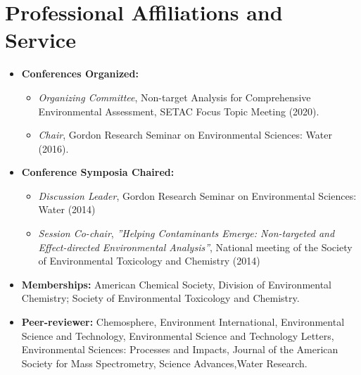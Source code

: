 \documentclass[letterpaper,10pt]{article}
\begin{document}
\section{Professional Affiliations and Service} 
\begin{itemize}
\item \textbf{Conferences Organized:} 
\begin{itemize}
\item \emph{Organizing Committee}, Non-target Analysis for Comprehensive Environmental Assessment, SETAC Focus Topic Meeting (2020).
\item \emph{Chair}, Gordon Research Seminar on Environmental Sciences: Water (2016).
\end{itemize}
\item \textbf{Conference Symposia Chaired:} 
\begin{itemize}
\item {} \emph{Discussion Leader}, Gordon Research Seminar on Environmental Sciences: Water (2014)
\item {} \emph{Session Co-chair}, \emph{''Helping Contaminants Emerge: Non-targeted and Effect-directed Environmental Analysis''}, National meeting of the Society of Environmental Toxicology and Chemistry (2014)
\end{itemize}
\item \textbf{Memberships:} American Chemical Society, Division of Environmental Chemistry; Society of Environmental Toxicology and Chemistry.
\item \textbf{Peer-reviewer:} Chemosphere,  Environment International, Environmental Science and Technology, Environmental Science and Technology Letters, Environmental Sciences: Processes and Impacts, Journal of the American Society for Mass Spectrometry, Science Advances,Water Research.
\end{itemize}
%
\end{document}
